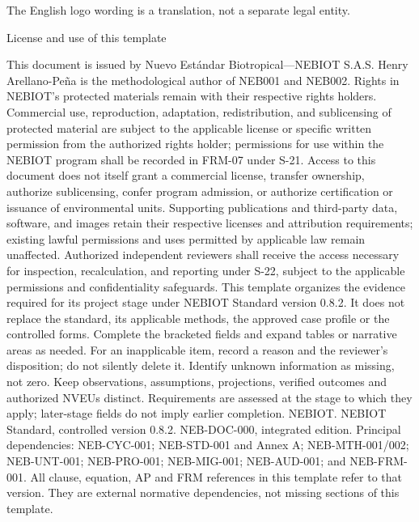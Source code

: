 {\sffamily\fontsize{7.5}{9.5}\selectfont\color{NEBGray}The English logo wording is a translation, not a separate legal entity.\par}
\clearpage
{\fontsize{23}{27}\selectfont\color{NEBGreen}License and use of this template\par}
\vspace{5mm}
This document is issued by Nuevo Estándar Biotropical—NEBIOT S.A.S. Henry Arellano-Peña is the methodological author of NEB001 and NEB002. Rights in NEBIOT's protected materials remain with their respective rights holders. Commercial use, reproduction, adaptation, redistribution, and sublicensing of protected material are subject to the applicable license or specific written permission from the authorized rights holder; permissions for use within the NEBIOT program shall be recorded in FRM-07 under S-21. Access to this document does not itself grant a commercial license, transfer ownership, authorize sublicensing, confer program admission, or authorize certification or issuance of environmental units. Supporting publications and third-party data, software, and images retain their respective licenses and attribution requirements; existing lawful permissions and uses permitted by applicable law remain unaffected. Authorized independent reviewers shall receive the access necessary for inspection, recalculation, and reporting under S-22, subject to the applicable permissions and confidentiality safeguards.
This template organizes the evidence required for its project stage under NEBIOT Standard version 0.8.2. It does not replace the standard, its applicable methods, the approved case profile or the controlled forms. Complete the bracketed fields and expand tables or narrative areas as needed. For an inapplicable item, record a reason and the reviewer’s disposition; do not silently delete it. Identify unknown information as missing, not zero. Keep observations, assumptions, projections, verified outcomes and authorized NVEUs distinct. Requirements are assessed at the stage to which they apply; later-stage fields do not imply earlier completion.
{\sffamily\fontsize{9}{11}\selectfont [1] NEBIOT. NEBIOT Standard, controlled version 0.8.2. NEB-DOC-000, integrated edition. Principal dependencies: NEB-CYC-001; NEB-STD-001 and Annex A; NEB-MTH-001/002; NEB-UNT-001; NEB-PRO-001; NEB-MIG-001; NEB-AUD-001; and NEB-FRM-001. All clause, equation, AP and FRM references in this template refer to that version. They are external normative dependencies, not missing sections of this template.}

